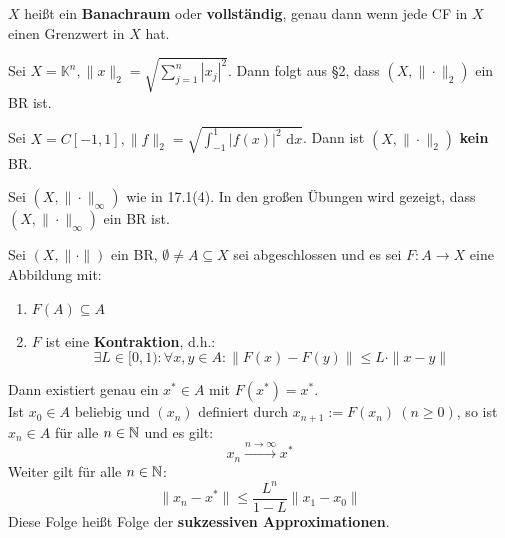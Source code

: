 \documentclass[a4paper,twoside,DIV15,BCOR12mm,chapterprefix=true,headings=twolinechapter]{scrbook}
\begin{document}
\begin{definition}
$X$ heißt ein \textbf{Banachraum} oder \textbf{vollständig}, genau dann wenn jede
CF in $X$ einen Grenzwert in $X$ hat.
\end{definition}

\begin{beispiele}
\item Sei $X=\mathbb{K}^n, \|x\|_2=\sqrt{\sum_{j=1}^n |x_j|^2}$. Dann folgt aus §2,
dass $(X,\|\cdot\|_2)$ ein BR ist.
\item Sei $X=C[-1,1], \|f\|_2=\sqrt{\int_{-1}^1 |f(x)|^2 \text{ d}x}$. Dann ist
$(X,\|\cdot\|_2)$ \textbf{kein} BR.
\item Sei $(X,\|\cdot\|_\infty)$ wie in 17.1(4). In den großen Übungen wird gezeigt,
dass $(X,\|\cdot\|_\infty)$ ein BR ist.
\end{beispiele}

\begin{satz}
Sei $(X,\|\cdot\|)$ ein BR, $\emptyset\ne A\subseteq X$ sei abgeschlossen und es sei
$F:A\to X$ eine Abbildung mit:
\renewcommand{\labelenumi}{(\roman{enumi})}
\begin{enumerate}
\item $F(A)\subseteq A$
\item $F$ ist eine \textbf{Kontraktion}, d.h.:
\[\exists L\in[0,1):\forall x,y\in A:\|F(x)-F(y)\|\le L\cdot \|x-y\|\]
\end{enumerate}
\renewcommand{\labelenumi}{(\arabic{enumi})}
Dann existiert genau ein $x^*\in A$ mit $F(x^*)=x^*$.\\
Ist $x_0\in A$ beliebig und $(x_n)$ definiert durch $x_{n+1}:=F(x_n)\ (n\ge 0)$,
so ist $x_n\in A$ für alle $n\in\mathbb{N}$ und es gilt:
\[x_n\stackrel{n\to\infty}\to x^*\]
Weiter gilt für alle $n\in\mathbb{N}$:
\[\|x_n-x^*\|\le\frac{L^n}{1-L}\|x_1-x_0\|\]
Diese Folge heißt Folge der \textbf{sukzessiven Approximationen}.
\end{satz}
\end{document}
